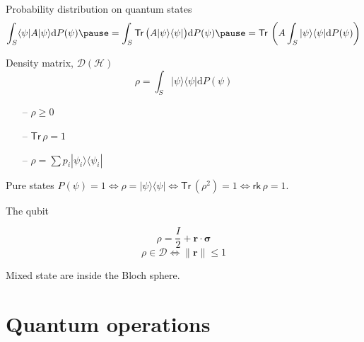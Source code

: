 \documentclass{beamer}
\newcommand{\ket}[1]{|#1\rangle}
\newcommand{\bra}[1]{\langle#1|}
\newcommand{\dd}{\mathrm{d}}
\newcommand{\bs}{\boldsymbol}
\newcommand{\Tr}{\mathsf{Tr}\,}
\newcommand{\rk}{\mathsf{rk}\,}
\begin{document}
\begin{frame}{Probability distribution on quantum states}
  \[\int_S \bra \psi A\ket \psi \dd P(\psi)\pause = \int_S \Tr\big(A\ket \psi \bra \psi\big) \dd
    P(\psi) \pause = \Tr\left(A \int_S\ket \psi \bra \psi \dd P(\psi) \right)\]
  \pause{}
  \begin{block}{Density matrix, $\mathcal{D}(\mathcal{H})$}
    \[\rho = \int_S\ket \psi \bra \psi \dd P(\psi)\]
  \end{block}

  \pause{}

\begin{itemize}
  \item[--] $\rho \geqslant 0$
    \pause{}
  \item[--] $\Tr \rho = 1$
    \pause{}
  \item[--] $\rho = \sum p_i \ket {\psi_i} \bra{\psi_i}$
\end{itemize}

  \pause{} \vspace{3mm}

\begin{block}{Pure states}
  $P(\psi) = 1 \iff \rho = \ket \psi \bra \psi \iff \Tr(\rho^2) = 1 \iff \rk
  \rho = 1$.
\end{block}
\end{frame}

\begin{frame}{The qubit}

  \vfill

  \[\rho = \frac I2 + \bs r \cdot \bs \sigma\]
  \[\rho \in \mathcal{D} \iff \|\bs r\| \leqslant 1\]

  \vfill

  \begin{center}
    \Large Mixed state are \alert{inside} the Bloch sphere.
  \end{center}

  \vfill

\end{frame}



\section{Quantum operations}
\end{document}
